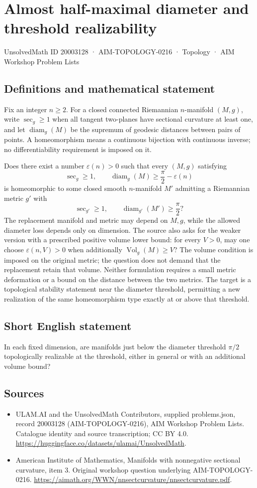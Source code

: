 \documentclass[11pt,a4paper]{article}
\begin{document}
\section*{Almost half-maximal diameter and threshold realizability}\label{20003128}
{\small UnsolvedMath ID 20003128 · AIM-TOPOLOGY-0216 · Topology · AIM Workshop Problem Lists}
\subsection{Definitions and mathematical statement}
Fix an integer $n\geq2$.
For a closed connected Riemannian $n$-manifold $(M,g)$, write $\sec_g\geq1$ when all tangent two-planes have sectional curvature at least one, and let $\operatorname{diam}_g(M)$ be the supremum of geodesic distances between pairs of points.
A homeomorphism means a continuous bijection with continuous inverse; no differentiability requirement is imposed on it.

Does there exist a number $\varepsilon(n)>0$ such that every $(M,g)$ satisfying
\[
 \sec_g\geq1,\qquad
 \operatorname{diam}_g(M)\geq\frac\pi2-\varepsilon(n)
\]
is homeomorphic to some closed smooth $n$-manifold $M'$ admitting a Riemannian metric $g'$ with
\[
 \sec_{g'}\geq1,\qquad
 \operatorname{diam}_{g'}(M')\geq\frac\pi2?
\]
The replacement manifold and metric may depend on $M,g$, while the allowed diameter loss depends only on dimension.
The source also asks for the weaker version with a prescribed positive volume lower bound: for every $V>0$, may one choose $\varepsilon(n,V)>0$ when additionally $\operatorname{Vol}_g(M)\geq V$?
The volume condition is imposed on the original metric; the question does not demand that the replacement retain that volume.
Neither formulation requires a small metric deformation or a bound on the distance between the two metrics.
The target is a topological stability statement near the diameter threshold, permitting a new realization of the same homeomorphism type exactly at or above that threshold.
\subsection{Short English statement}
In each fixed dimension, are manifolds just below the diameter threshold $\pi/2$ topologically realizable at the threshold, either in general or with an additional volume bound?
\subsection{Sources}
\begin{itemize}
\item[S1] ULAM.AI and the UnsolvedMath Contributors, supplied problems.json, record 20003128 (AIM-TOPOLOGY-0216), AIM Workshop Problem Lists. Catalogue identity and source transcription; CC BY 4.0.
\url{https://huggingface.co/datasets/ulamai/UnsolvedMath}.
\item[S2] American Institute of Mathematics, Manifolds with nonnegative sectional curvature, item 3. Original workshop question underlying AIM-TOPOLOGY-0216.
\url{https://aimath.org/WWN/nnsectcurvature/nnsectcurvature.pdf}.
\end{itemize}
\end{document}
